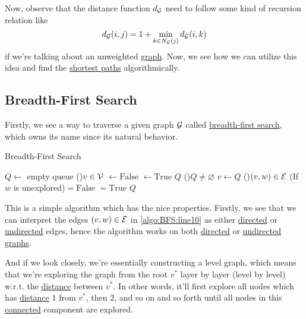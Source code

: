 Now, observe that the distance function \(d_{\mathcal{\MakeUppercase{g}} } \) need to follow some kind of recursion relation like
\[
	d_{\mathcal{\MakeUppercase{g}} } (i, j) = 1 + \min_{k\in N_{\mathcal{\MakeUppercase{g}} } (j)} d_{\mathcal{\MakeUppercase{g}} } (i, k)
\]
if we're talking about an unweighted \hyperref[def:graph]{graph}. Now, we see how we can utilize this idea and find the \hyperref[def:shortest-path]{shortest paths} algorithmically.

\subsection{Breadth-First Search}
Firstly, we see a way to traverse a given graph \(\mathcal{\MakeUppercase{g}} \) called \hyperref[algo:BFS]{breadth-first search}, which owns its name since its natural behavior.

\begin{algorithm}[H]\label{algo:BFS}
	\DontPrintSemicolon
	\caption{Breadth-First Search}
	\BlankLine
	\(Q\gets \) empty queue
	\For(){\(v\in \mathcal{\MakeUppercase{v}} \)}{
		\(\gets \mathrm{False}\)
	}
	\;
	\(\gets \mathrm{True}\) 
	\(Q\)\;
	\;
	\While(){\(Q\neq \varnothing \)}{
		\(v\gets Q\)\pop{}\;
		\For(\label{algo:BFS:line10}){\((v, w)\in\mathcal{\MakeUppercase{E}}\)}{
			\If(If \(w\) is unexplored){\(= \mathrm{False}\)}{
				\(=\mathrm{True}\)
				\(Q\)\;
			}
		}
	}
	\Return{}\;
\end{algorithm}

This is a simple algorithm which has the nice properties. Firstly, we see that we can interpret the edges \((v, w)\in \mathcal{\MakeUppercase{e}} \) in \autoref{algo:BFS:line10} as either \hyperref[def:directed-graph]{directed} or \hyperref[def:undirected-graph]{undirected} edges, hence the algorithm works on both \hyperref[def:directed-graph]{directed} or \hyperref[def:undirected-graph]{undirected graphs}.

\begin{intuition}
	And if we look closely, we're essentially constructing a level graph, which means that we're exploring the graph from the root \(v^{\ast} \) layer by layer (level by level) w.r.t. the \hyperref[def:distance-between-nodes]{distance} between \(v^{\ast}\). In other words, it'll first explore all nodes which has \hyperref[def:distance-between-nodes]{distance} \(1\) from \(v^{\ast} \), then \(2\), and so on and so forth until all nodes in this \hyperref[def:connected]{connected} component are explored.
\end{intuition}

